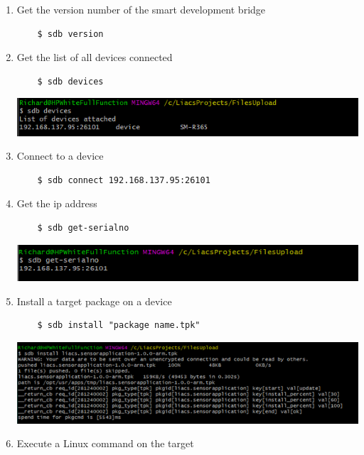 \documentclass[12pt, a4paper]{article}
\begin{document}
\begin{enumerate}
    \item Get the version number of the smart development bridge
\begin{verbatim}
    $ sdb version
\end{verbatim}
    \item Get the list of all devices connected
    \begin{verbatim}
    $ sdb devices

\end{verbatim}
        \begin{center}
    \includegraphics[width=.999\textwidth]{Pic 20.png}
\end{center}
    \item Connect to a device
    \begin{verbatim}
    $ sdb connect 192.168.137.95:26101
\end{verbatim}
    \item Get the ip address
     \begin{verbatim}
    $ sdb get-serialno
\end{verbatim}
        \begin{center}
    \includegraphics[width=.999\textwidth]{Pic 21.png}
\end{center}
    \item Install a target package on a device
         \begin{verbatim}
    $ sdb install "package name.tpk"
\end{verbatim}
        \begin{center}
    \includegraphics[width=.999\textwidth]{Pic 22.png}
\end{center}
    \item Execute a Linux command on the target
          \begin{verbatim}

\end{verbatim}
\end{enumerate}
\end{document}

